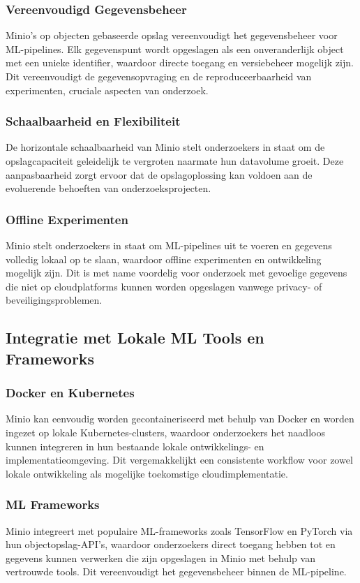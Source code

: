 \subsubsection{Vereenvoudigd Gegevensbeheer}
Minio's op objecten gebaseerde opslag vereenvoudigt het gegevensbeheer voor ML-pipelines. Elk gegevenspunt wordt opgeslagen als een onveranderlijk object met een unieke identifier, waardoor directe toegang en versiebeheer mogelijk zijn. Dit vereenvoudigt de gegevensopvraging en de reproduceerbaarheid van experimenten, cruciale aspecten van onderzoek.

\subsubsection{Schaalbaarheid en Flexibiliteit}
De horizontale schaalbaarheid van Minio stelt onderzoekers in staat om de opslagcapaciteit geleidelijk te vergroten naarmate hun datavolume groeit. Deze aanpasbaarheid zorgt ervoor dat de opslagoplossing kan voldoen aan de evoluerende behoeften van onderzoeksprojecten.

\subsubsection{Offline Experimenten}
Minio stelt onderzoekers in staat om ML-pipelines uit te voeren en gegevens volledig lokaal op te slaan, waardoor offline experimenten en ontwikkeling mogelijk zijn. Dit is met name voordelig voor onderzoek met gevoelige gegevens die niet op cloudplatforms kunnen worden opgeslagen vanwege privacy- of beveiligingsproblemen.

\subsection{Integratie met Lokale ML Tools en Frameworks}

\subsubsection{Docker en Kubernetes}
Minio kan eenvoudig worden gecontaineriseerd met behulp van Docker en worden ingezet op lokale Kubernetes-clusters, waardoor onderzoekers het naadloos kunnen integreren in hun bestaande lokale ontwikkelings- en implementatieomgeving. Dit vergemakkelijkt een consistente workflow voor zowel lokale ontwikkeling als mogelijke toekomstige cloudimplementatie.

\subsubsection{ML Frameworks}
Minio integreert met populaire ML-frameworks zoals TensorFlow en PyTorch via hun objectopslag-API's, waardoor onderzoekers direct toegang hebben tot en gegevens kunnen verwerken die zijn opgeslagen in Minio met behulp van vertrouwde tools. Dit vereenvoudigt het gegevensbeheer binnen de ML-pipeline.

